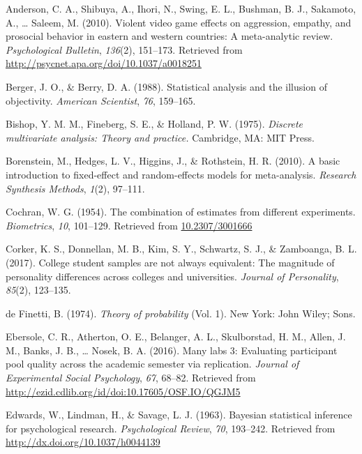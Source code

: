 \documentclass[english,man]{apa6}
\theoremstyle{definition}
\theoremstyle{definition}
\theoremstyle{remark}
\begin{document}
\hypertarget{ref-Anderson:etal:2010}{}
Anderson, C. A., Shibuya, A., Ihori, N., Swing, E. L., Bushman, B. J.,
Sakamoto, A., \ldots{} Saleem, M. (2010). Violent video game effects on
aggression, empathy, and prosocial behavior in eastern and western
countries: A meta-analytic review. \emph{Psychological Bulletin},
\emph{136}(2), 151--173. Retrieved from
\url{http://psycnet.apa.org/doi/10.1037/a0018251}

\hypertarget{ref-Berger:Berry:1988}{}
Berger, J. O., \& Berry, D. A. (1988). Statistical analysis and the
illusion of objectivity. \emph{American Scientist}, \emph{76}, 159--165.

\hypertarget{ref-Bishop:etal:1975}{}
Bishop, Y. M. M., Fineberg, S. E., \& Holland, P. W. (1975).
\emph{Discrete multivariate analysis: Theory and practice.} Cambridge,
MA: MIT Press.

\hypertarget{ref-Borenstein:etal:2010}{}
Borenstein, M., Hedges, L. V., Higgins, J., \& Rothstein, H. R. (2010).
A basic introduction to fixed-effect and random-effects models for
meta-analysis. \emph{Research Synthesis Methods}, \emph{1}(2), 97--111.

\hypertarget{ref-Cochran:1954}{}
Cochran, W. G. (1954). The combination of estimates from different
experiments. \emph{Biometrics}, \emph{10}, 101--129. Retrieved from
\url{10.2307/3001666}

\hypertarget{ref-Corker:etal:2017}{}
Corker, K. S., Donnellan, M. B., Kim, S. Y., Schwartz, S. J., \&
Zamboanga, B. L. (2017). College student samples are not always
equivalent: The magnitude of personality differences across colleges and
universities. \emph{Journal of Personality}, \emph{85}(2), 123--135.

\hypertarget{ref-deFinetti:1974}{}
de Finetti, B. (1974). \emph{Theory of probability} (Vol. 1). New York:
John Wiley; Sons.

\hypertarget{ref-Ebersole:etal:2016}{}
Ebersole, C. R., Atherton, O. E., Belanger, A. L., Skulborstad, H. M.,
Allen, J. M., Banks, J. B., \ldots{} Nosek, B. A. (2016). Many labs 3:
Evaluating participant pool quality across the academic semester via
replication. \emph{Journal of Experimental Social Psychology},
\emph{67}, 68--82. Retrieved from
\url{http://ezid.cdlib.org/id/doi:10.17605/OSF.IO/QGJM5}

\hypertarget{ref-Edwards:etal:1963}{}
Edwards, W., Lindman, H., \& Savage, L. J. (1963). Bayesian statistical
inference for psychological research. \emph{Psychological Review},
\emph{70}, 193--242. Retrieved from
\url{http://dx.doi.org/10.1037/h0044139}
\end{document}
